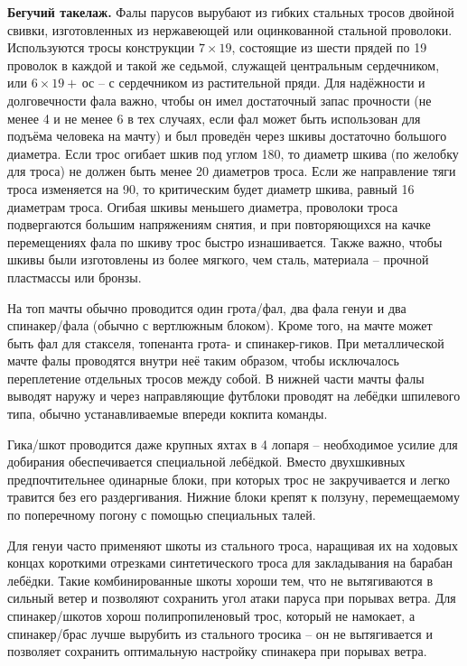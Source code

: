 \textbf{Бегучий такелаж.}
Фалы парусов вырубают из гибких
стальных тросов двойной свивки, изготовленных из нержавеющей или
оцинкованной стальной проволоки. Используются тросы конструкции
$7 \times 19$, состоящие из шести прядей по 19 проволок в каждой и
такой же седьмой, служащей центральным сердечником, или
$6 \times 19 + $\,ос \--- с сердечником из растительной пряди. Для
надёжности и долговечности фала важно, чтобы он имел достаточный запас
прочности (не менее 4 и не менее 6 в тех случаях, если фал может быть
использован для подъёма человека на мачту) и был проведён через шкивы
достаточно большого диаметра. Если трос огибает шкив под углом 180\gr,
то диаметр шкива (по желобку для троса) не должен быть менее 20
диаметров троса. Если же направление тяги троса изменяется на 90\gr,
то критическим будет диаметр шкива, равный 16 диаметрам троса. Огибая
шкивы меньшего диаметра, проволоки троса подвергаются большим
напряжениям снятия, и при повторяющихся на качке перемещениях фала по
шкиву трос быстро изнашивается. Также важно, чтобы шкивы были
изготовлены из более мягкого, чем сталь, материала \--- прочной
пластмассы или бронзы.

На топ мачты обычно проводится один грота\-/фал, два фала генуи и два
спинакер\-/фала (обычно с вертлюжным блоком). Кроме того, на мачте
может быть фал для стакселя, топенанта грота- и спинакер-гиков. При
металлической мачте фалы проводятся внутри неё таким образом, чтобы
исключалось переплетение отдельных тросов между собой. В нижней части
мачты фалы выводят наружу и через направляющие футблоки проводят на
лебёдки шпилевого типа, обычно устанавливаемые впереди кокпита
команды.

Гика\-/шкот проводится даже крупных яхтах в 4 лопаря \--- необходимое
усилие для добирания обеспечивается специальной лебёдкой. Вместо
двухшкивных предпочтительнее одинарные блоки, при которых трос не
закручивается и легко травится без его раздергивания. Нижние блоки
крепят к ползуну, перемещаемому по поперечному погону с помощью
специальных талей.

Для генуи часто применяют шкоты из стального троса, наращивая их на
ходовых концах короткими отрезками синтетического троса для
закладывания на барабан лебёдки. Такие комбинированные шкоты хороши
тем, что не вытягиваются в сильный ветер и позволяют сохранить угол
атаки паруса при порывах ветра. Для спинакер\-/шкотов хорош
полипропиленовый трос, который не намокает, а спинакер\-/брас лучше
вырубить из стального тросика \--- он не вытягивается и позволяет
сохранить оптимальную настройку спинакера при порывах ветра.

